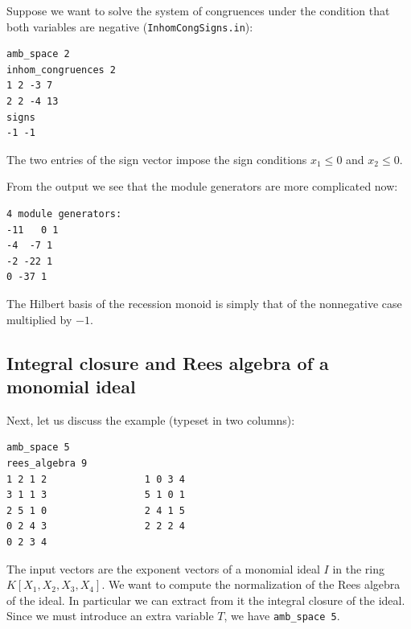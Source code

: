 Suppose we want to solve the system of congruences under the condition that both variables are negative (\verb|InhomCongSigns.in|):

\begin{Verbatim}
amb_space 2
inhom_congruences 2
1 2 -3 7
2 2 -4 13
signs
-1 -1
\end{Verbatim}
The two entries of the sign vector impose the sign conditions $x_1\le 0$ and $x_2\le 0$.

From the output we see that the module generators are more complicated now:
\begin{Verbatim}
4 module generators:
-11   0 1
-4  -7 1
-2 -22 1
0 -37 1
\end{Verbatim}
The Hilbert basis of the recession monoid is simply that of the nonnegative case multiplied by $-1$.

\subsection{Integral closure and Rees algebra of a monomial ideal}\label{Rees}

Next, let us discuss the example  (typeset in two columns):

\begin{Verbatim}
amb_space 5
rees_algebra 9
1 2 1 2                 1 0 3 4
3 1 1 3                 5 1 0 1
2 5 1 0                 2 4 1 5
0 2 4 3                 2 2 2 4
0 2 3 4
\end{Verbatim}
The input vectors are the exponent vectors of a monomial ideal $I$ in the ring $K[X_1,X_2,X_3,X_4]$. We want to compute the normalization of the Rees algebra of the ideal. In particular we can extract from it the integral closure of the ideal. Since we must introduce an extra variable $T$, we have \verb|amb_space 5|.

